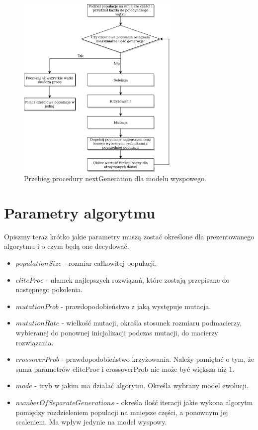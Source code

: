 \begin{figure}[H]
    \centering        
    \includegraphics[width=0.7\textwidth]{img/next_gen_wyspowy.png}
    \caption{Przebieg procedury nextGeneration dla modelu wyspowego.}
    \label{next_gen_wyspowy_img}
\end{figure}


\section{Parametry algorytmu}
Opiszmy teraz krótko jakie parametry muszą zostać określone dla prezentowanego algorytmu i o czym będą one decydować.

\begin{itemize}
    \item $populationSize$ - rozmiar całkowitej populacji.
    \item $eliteProc$ - ułamek najlepszych rozwiązań, które zostają przepisane do następnego pokolenia.
    \item $mutationProb$ - prawdopodobieństwo z jaką występuje mutacja.
    \item $mutationRate$ - wielkość mutacji, określa stosunek rozmiaru podmacierzy, wybieranej do ponownej inicjalizacji podczas mutacji, 
    do macierzy rozwiązania.
    \item $crossoverProb$ - prawdopodobieństwo krzyżowania. Należy pamiętać o tym, że suma parametrów eliteProc i crossoverProb nie 
    może być większa niż $1$.
    \item $mode$ - tryb w jakim ma działać algorytm. Określa wybrany model ewolucji.
    \item $numberOfSeparateGenerations$ - określa ilość iteracji jakie wykona algorytm pomiędzy rozdzieleniem populacji na 
    mniejsze części, a ponownym jej scaleniem. Ma wpływ jedynie na model wyspowy. 
\end{itemize}

